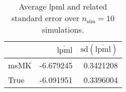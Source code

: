 \begin{table}[H]

\caption{Average lpml and related standard error over $n_{\text{sim}} = 10$ simulations.}
\centering
\begin{tabular}[t]{lrr}
\toprule
  & $\overbar{\text{lpml}}$ & $\text{sd}(\overbar{\text{lpml}})$\\
\midrule
msMK & -6.679245 & 0.3421208\\
True & -6.091951 & 0.3396004\\
\bottomrule
\end{tabular}
\end{table}